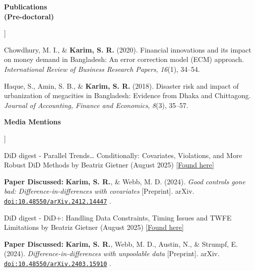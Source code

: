 \documentclass[11pt]{article}
\newcommand{\cvlabel}[1]{%
    \raisebox{0pt}[0pt][0pt]{%
        \parbox[t]{1.38in}{%
            \raggedright
            \bfseries
            #1
        }%
    }%
}
\newcommand{\doi}[1]{%
    \href{https://doi.org/#1}{\nolinkurl{doi:#1}}%
}
\begin{document}
\begin{cvsections}
\begin{cvitems}
\end{cvitems}


\item[\cvlabel{Publications\\(Pre-doctoral)}]

\begin{cvitems}

\item
Chowdhury, M. I.,
\& \textbf{Karim, S. R.} (2020).
Financial innovations and its impact on money demand in Bangladesh:
An error correction model (ECM) approach.
\textit{International Review of Business Research Papers},
\textit{16}(1), 34--54.


\item
Haque, S.,
Amin, S. B.,
\& \textbf{Karim, S. R.} (2018).
Disaster risk and impact of urbanization of megacities in Bangladesh:
Evidence from Dhaka and Chittagong.
\textit{Journal of Accounting, Finance and Economics},
\textit{8}(3), 35--57.

\end{cvitems}


\item[\cvlabel{Media Mentions}]

\begin{cvitems}

\item
DiD digest - Parallel Trends\ldots{} Conditionally:
Covariates, Violations, and More Robust DiD Methods
by Beatriz Gietner (August 2025)
\href{https://www.diddigest.xyz/p/parallel-trends-conditionally-covariates}
{[Found here]}

\textbf{Paper Discussed:}
\textbf{Karim, S. R.},
\& Webb, M. D. (2024).
\textit{
Good controls gone bad:
Difference-in-differences with covariates
}
[Preprint].
arXiv.
\doi{10.48550/arXiv.2412.14447}.


\item
DiD digest - DiD+:
Handling Data Constraints, Timing Issues and TWFE Limitations
by Beatriz Gietner (August 2025)
\href{https://www.diddigest.xyz/p/did-handling-data-constraints-timing}
{[Found here]}

\textbf{Paper Discussed:}
\textbf{Karim, S. R.},
Webb, M. D.,
Austin, N.,
\& Strumpf, E. (2024).
\textit{
Difference-in-differences with unpoolable data
}
[Preprint].
arXiv. 
\doi{10.48550/arXiv.2403.15910}.



\end{cvitems}
\end{cvsections}
\end{document}
